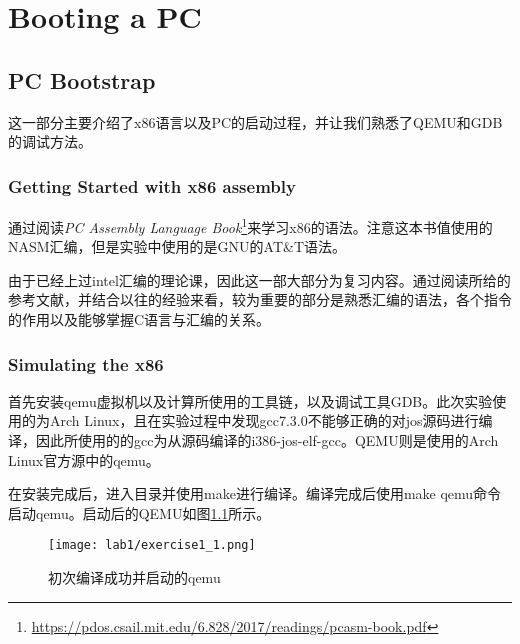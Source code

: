 \chapter{Booting a PC}
\label{cha:booting_a_pc}


\section{PC Bootstrap}
\par 这一部分主要介绍了x86语言以及PC的启动过程，并让我们熟悉了QEMU和GDB的调试方法。

\subsection{Getting Started with x86 assembly}
\par 通过阅读\emph{PC Assembly Language Book}\footnote{\url{https://pdos.csail.mit.edu/6.828/2017/readings/pcasm-book.pdf}}来学习x86的语法。注意这本书值使用的NASM汇编，但是实验中使用的是GNU的AT\&T语法。


\begin{exerciseSolution}{1}
\par 由于已经上过intel汇编的理论课，因此这一部大部分为复习内容。通过阅读所给的参考文献，并结合以往的经验来看，较为重要的部分是熟悉汇编的语法，各个指令的作用以及能够掌握C语言与汇编的关系。
\end{exerciseSolution}

\subsection{Simulating the x86}
\par 首先安装qemu虚拟机以及计算所使用的工具链，以及调试工具GDB。此次实验使用的为Arch Linux，且在实验过程中发现gcc7.3.0不能够正确的对jos源码进行编译，因此所使用的的gcc为从源码编译的i386-jos-elf-gcc。QEMU则是使用的Arch Linux官方源中的qemu。
\par 在安装完成后，进入目录并使用make进行编译。编译完成后使用make qemu命令启动qemu。启动后的QEMU如图\ref{fig:exercise1_1}所示。
\begin{figure}[htb]
    \centering
    \texttt{[image: lab1/exercise1\_1.png]}
    \caption{初次编译成功并启动的qemu}
    \label{fig:exercise1_1}
\end{figure}

